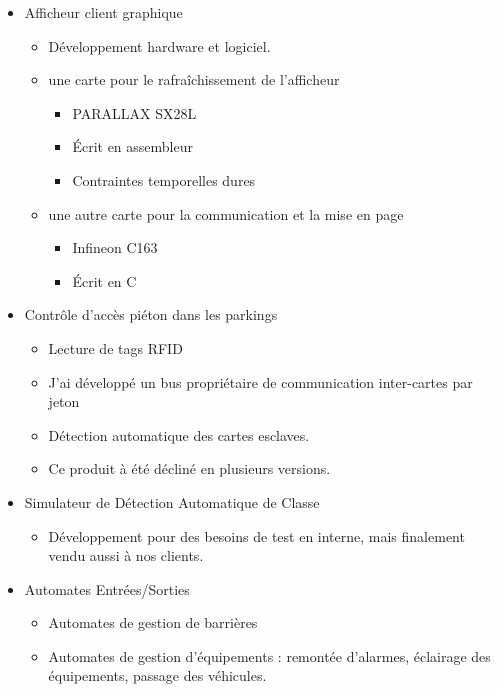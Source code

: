 \documentclass[11pt,a4paper,sans]{moderncv}   %
\begin{document}
{\begin{itemize}
\begin{itemize}
   \item Cette afficheur est décliné sous de nombreuses versions spécifiques.
  \end{itemize}
 \item Afficheur client graphique
  \begin{itemize}
   \item Développement hardware et logiciel.
   \item une carte pour le rafraîchissement de l'afficheur
    \begin{itemize}
     \item PARALLAX SX28L
     \item Écrit en assembleur
     \item Contraintes temporelles dures
    \end{itemize}
   \item une autre carte pour la communication et la mise en page
    \begin{itemize}
     \item Infineon C163
     \item Écrit en C
    \end{itemize}
  \end{itemize}
 \item Contrôle d'accès piéton dans les parkings
  \begin{itemize}
   \item Lecture de tags RFID
   \item J'ai développé un bus propriétaire de communication inter-cartes par jeton
   \item Détection automatique des cartes esclaves.
   \item Ce produit à été décliné en plusieurs versions.
  \end{itemize}
 \item Simulateur de Détection Automatique de Classe
  \begin{itemize}
   \item Développement pour des besoins de test en interne, mais finalement vendu aussi à nos clients.
  \end{itemize}
 \item Automates Entrées/Sorties
  \begin{itemize}
   \item Automates de gestion de barrières
   \item Automates de gestion d'équipements : remontée d'alarmes, éclairage des équipements, passage des véhicules.
  \end{itemize}
\end{itemize}}
\end{document}
